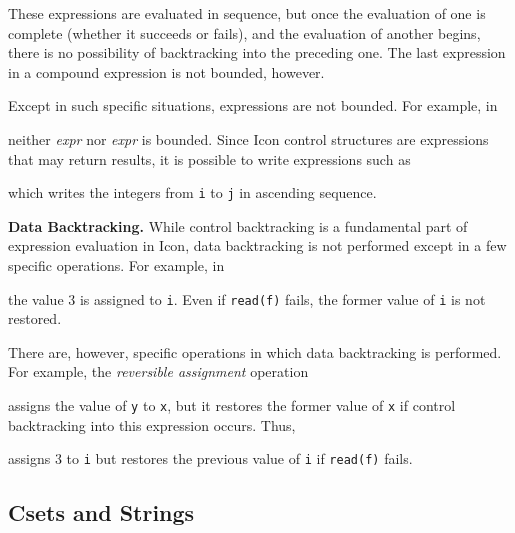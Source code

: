 
These expressions are evaluated in sequence, but once the evaluation
of one is complete (whether it succeeds or fails), and the evaluation
of another begins, there is no possibility of backtracking into the
preceding one. The last expression in a compound expression is not
bounded, however.

Except in such specific situations, expressions are not bounded. For
example, in


\noindent neither \textit{expr}\textit{} nor
\textit{expr}\textit{} is bounded. Since Icon control
structures are expressions that may return results, it is possible to
write expressions such as


\noindent
which writes the integers from \texttt{i} to \texttt{j} in ascending sequence.


\textbf{Data Backtracking.} While control backtracking is a
fundamental part of expression evaluation in Icon, data backtracking
is not performed except in a few specific operations. For example, in


\noindent the value 3 is assigned to \texttt{i}. Even if
\texttt{read(f)} fails, the former value of \texttt{i} is not
restored.

There are, however, specific operations in which data backtracking is
performed. For example, the \textit{reversible assignment} operation


\noindent assigns the value of \texttt{y} to \texttt{x}, but it
restores the former value of \texttt{x} if control backtracking into
this expression occurs.  Thus,


\noindent
assigns 3 to \texttt{i} but restores the previous value of \texttt{i}
if \texttt{read(f)} fails.


\subsection{Csets and Strings}

